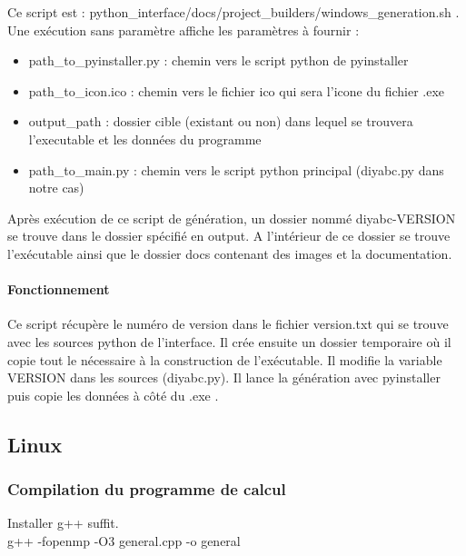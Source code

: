 \documentclass[12pt,a4paper]{article}
\begin{document}
        Ce script est : python\_interface/docs/project\_builders/windows\_generation.sh . Une 
        exécution sans paramètre affiche les paramètres à fournir : \\

        \begin{itemize}
            \item path\_to\_pyinstaller.py : chemin vers le script python de pyinstaller
            \item path\_to\_icon.ico : chemin vers le fichier ico qui sera l'icone du fichier .exe
            \item output\_path : dossier cible (existant ou non) dans lequel se trouvera l'executable et les données du programme
            \item path\_to\_main.py : chemin vers le script python principal (diyabc.py dans notre cas)\\
        \end{itemize}

        Après exécution de ce script de génération, un dossier nommé
        diyabc-VERSION se trouve dans le dossier spécifié en output. A
        l'intérieur de ce dossier se trouve l'exécutable ainsi que le dossier
        docs contenant des images et la documentation.

        \paragraph{Fonctionnement}

        Ce script récupère le numéro de version dans le fichier version.txt qui
        se trouve avec les sources python de l'interface. Il crée ensuite un
        dossier temporaire où il copie tout le nécessaire à la construction de
        l'exécutable. Il modifie la variable VERSION dans les sources
        (diyabc.py).  Il lance la génération avec pyinstaller puis copie les
        données à côté du .exe .

    \subsection{Linux}
        \subsubsection{Compilation du programme de calcul}
        Installer g++ suffit.\\

        g++ -fopenmp -O3 general.cpp -o general
\end{document}
